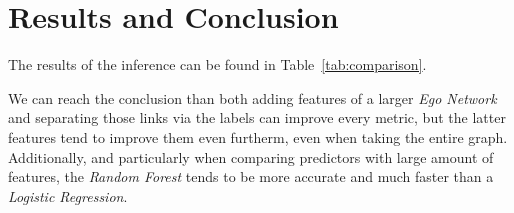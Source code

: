 \section{Results and Conclusion}
\label{sec:results}


The results of the inference can be found in Table~\ref{tab:comparison}.

We can reach the conclusion than both adding features of a larger \emph{Ego Network} and separating those links via the labels can improve every metric, but the latter features tend to improve them even furtherm, even when taking the entire graph. Additionally, and particularly when comparing predictors with large amount of features, the \emph{Random Forest} tends to be more accurate and much faster than a \emph{Logistic Regression}.
